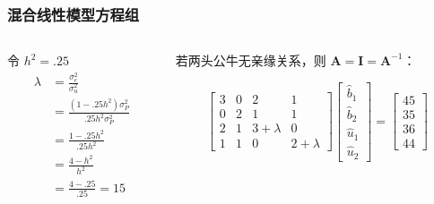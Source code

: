 \documentclass[serif,aspectratio=169]{beamer}
\begin{document}
\begin{frame}
  \frametitle{混合线性模型方程组}
  \begin{columns}
    \begin{column}{.4\textwidth}
      令 $h^2=.25$
      \begin{align*}
        \lambda &= \frac{\sigma_e^2}{\sigma_u^2}\\
        &=\frac{(1-.25h^2)\sigma_P^2}{.25h^2\sigma_P^2}\\
        &=\frac{1-.25h^2}{.25h^2}\\
        &=\frac{4-h^2}{h^2}\\
        &=\frac{4-.25}{.25}=15
      \end{align*}
    \end{column}

    \begin{column}{.6\textwidth}
      若两头公牛无亲缘关系，则 $\mathbf{A=I=A}^{-1}$：
      
      $$
      \left[\begin{array}{cccc}
          3 & 0 & 2 & 1\\
          0 & 2 & 1 & 1\\
          2 & 1 & 3+\lambda & 0\\
          1 & 1 & 0 & 2+\lambda
        \end{array}\right]
      \left[\begin{array}{c}
          \hat{b}_1\\
          \hat{b}_2\\
          \hat{u}_1\\
          \hat{u}_2
        \end{array}\right]=
      \left[\begin{array}{c}
          45\\
          35\\
          36\\
          44
        \end{array}\right]
      $$
      
    \end{column}
  \end{columns}
\end{frame}
\end{document}
